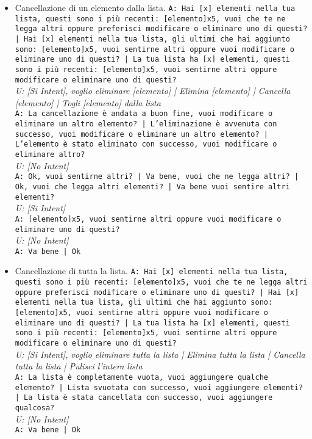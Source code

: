 \begin{itemize}
\begin{itemize}
		\item Cancellazione di un elemento dalla lista.
		\texttt{A: Hai [x] elementi nella tua lista, questi sono i più recenti: [elemento]x5, vuoi che te ne legga altri oppure preferisci modificare o eliminare uno di questi? | Hai [x] elementi nella tua lista, gli ultimi che hai aggiunto sono: [elemento]x5, vuoi sentirne altri oppure vuoi modificare o eliminare uno di questi? | La tua lista ha [x] elementi, questi sono i più recenti: [elemento]x5, vuoi sentirne altri oppure modificare o eliminare uno di questi? }\\
		\textit{U: [Si Intent], voglio eliminare [elemento] | Elimina [elemento] | Cancella [elemento] | Togli [elemento] dalla lista}\\
		\texttt{A: La cancellazione è andata a buon fine, vuoi modificare o eliminare un altro elemento? | L'eliminazione è avvenuta con successo, vuoi modificare o eliminare un altro elemento? | L'elemento è stato eliminato con successo, vuoi modificare o eliminare altro?}\\
		\textit{U: [No Intent]}\\
		\texttt{A: Ok, vuoi sentirne altri? | Va bene, vuoi che ne legga altri? | Ok, vuoi che legga altri elementi? | Va bene vuoi sentire altri elementi? }\\
		\textit{U: [Si Intent] }\\
		\texttt{A: [elemento]x5, vuoi sentirne altri oppure vuoi modificare o eliminare uno di questi? }\\
		\textit{U: [No Intent]}\\
		\texttt{A: Va bene | Ok}
		
		\item Cancellazione di tutta la lista.
		\texttt{A: Hai [x] elementi nella tua lista, questi sono i più recenti: [elemento]x5, vuoi che te ne legga altri oppure preferisci modificare o eliminare uno di questi? | Hai [x] elementi nella tua lista, gli ultimi che hai aggiunto sono: [elemento]x5, vuoi sentirne altri oppure vuoi modificare o eliminare uno di questi? | La tua lista ha [x] elementi, questi sono i più recenti: [elemento]x5, vuoi sentirne altri oppure modificare o eliminare uno di questi? }\\
		\textit{U: [Si Intent], voglio eliminare tutta la lista | Elimina tutta la lista | Cancella tutta la lista | Pulisci l'intera lista }\\
		\texttt{A: La lista è completamente vuota, vuoi aggiungere qualche elemento? | Lista svuotata con successo, vuoi aggiungere elementi? | La lista è stata cancellata con successo, vuoi aggiungere qualcosa?}\\
		\textit{U: [No Intent]}\\
		\texttt{A: Va bene | Ok}
	\end{itemize}
	

\end{itemize}
